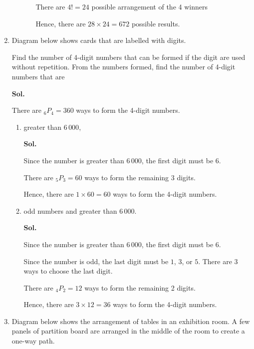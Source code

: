 \documentclass{report}
\newcommand\permtwo[2][^n]{{}_{#1}P_{#2}}
\newcommand{\sol}[1]{

      \noindent \textbf{Sol.}
}
\def\eos{\quad\hbox{\rlap{\hbox{\vrule depth 1.5pt height 2.6mm width 0.2mm \hskip 1mm \vrule height 2.6mm width 0.2mm}}{\vbox{\hrule height 0.2mm width 1.4mm \vskip 2.8mm \hrule depth 1.5pt height -0.35mm width 1.2mm}}}}
\begin{document}
\begin{multicols*}{2}
\begin{enumerate}
\begin{enumerate}
\begin{enumerate}
                                          There are $4! = 24$ possible arrangement of the 4 winners

                                          Hence, there are $28 \times 24 = 672$ possible results. $\eos$
                              \end{enumerate}
                  \end{enumerate}

            \item Diagram below shows cards that are labelled with digits.

                  Find the number of 4-digit numbers that can be formed if the digit are used
                  without repetition. From the numbers formed, find the number of 4-digit numbers
                  that are \sol{}

                  There are $\permtwo[6]{4} = 360$ ways to form the 4-digit numbers.
                  \begin{enumerate}
                        \item greater than $6\,000$, \sol{}

                              Since the number is greater than $6\,000$, the first digit must be $6$.

                              There are $\permtwo[5]{3} = 60$ ways to form the remaining 3 digits.

                              Hence, there are $1\times 60 = 60$ ways to form the 4-digit numbers. $\eos$

                        \item odd numbers and greater than $6\,000$. \sol{}

                              Since the number is greater than $6\,000$, the first digit must be $6$.

                              Since the number is odd, the last digit must be $1$, $3$, or $5$. There are $3$
                              ways to choose the last digit.

                              There are $\permtwo[4]{2} = 12$ ways to form the remaining 2 digits.

                              Hence, there are $3\times 12 = 36$ ways to form the 4-digit numbers. $\eos$
                  \end{enumerate}

            \item Diagram below shows the arrangement of tables in an exhibition room. A few
                  panels of partition board are arranged in the middle of the room to create a
                  one-way path.


\end{enumerate}
\end{multicols*}
\end{document}
